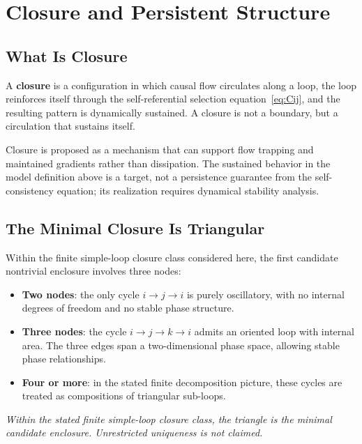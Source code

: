 \section{Closure and Persistent Structure}
\label{sec:closure}

\subsection{What Is Closure}

A \textbf{closure} is a configuration in which causal flow circulates along
a loop, the loop reinforces itself through the self-referential selection
equation~\cref{eq:Cij}, and the resulting pattern is dynamically sustained.
A closure is not a boundary, but a circulation that sustains itself.

Closure is proposed as a mechanism that can support flow trapping and
maintained gradients rather than dissipation. The sustained behavior in the
model definition above is a target, not a persistence guarantee from the
self-consistency equation; its realization requires dynamical stability analysis.

\subsection{The Minimal Closure Is Triangular}

Within the finite simple-loop closure class considered here, the first
candidate nontrivial enclosure involves three nodes:

\begin{itemize}
  \item \textbf{Two nodes}: the only cycle $i \to j \to i$ is purely
    oscillatory, with no internal degrees of freedom and no stable phase
    structure.
  \item \textbf{Three nodes}: the cycle $i \to j \to k \to i$ admits an
    oriented loop with internal area. The three edges span a two-dimensional
    phase space, allowing stable phase relationships.
  \item \textbf{Four or more}: in the stated finite decomposition picture,
    these cycles are treated as compositions of triangular sub-loops.
\end{itemize}

\begin{keybox}
\textit{Within the stated finite simple-loop closure class, the triangle is
the minimal candidate enclosure.  Unrestricted uniqueness is not claimed.}
\end{keybox}

